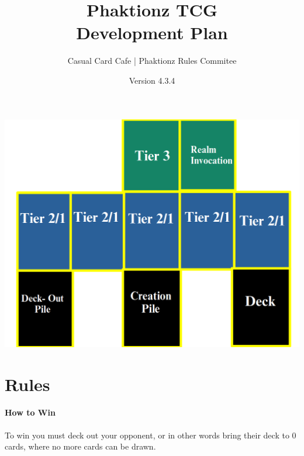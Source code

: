 \documentclass[12pt, letterpaper]{article}
\title{Phaktionz TCG \\Development Plan}
\author{Casual Card Cafe | Phaktionz Rules Commitee}
\date{Version 4.3.4}
\begin{document}
\maketitle
{}
\newpage
\tableofcontents
\newpage
\begin{center}
    \includegraphics[scale = 0.25]{images/field.png}
\end{center}


\section{Rules}
\paragraph{How to Win\\}
To win you must deck out your opponent, or in other words bring their deck to 0 cards, where no more cards can be drawn.
\end{document}
